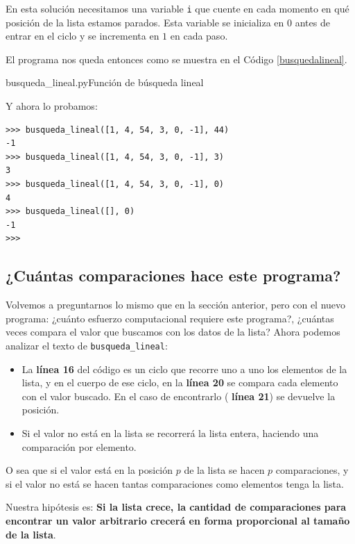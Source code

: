 En esta solución necesitamos una variable \lstinline!i! que cuente en cada
momento en qué posición de la lista estamos parados. Esta variable se
inicializa en $0$ antes de entrar en el ciclo y se incrementa en $1$ en
cada paso.

El programa nos queda entonces como se muestra en el Código
\ref{busquedalineal}. \\

\begin{codigo}{busqueda\_lineal.py}{Función de búsqueda lineal}
\label{busquedalineal}

\end{codigo}

Y ahora lo probamos:
\begin{verbatim}
>>> busqueda_lineal([1, 4, 54, 3, 0, -1], 44)
-1
>>> busqueda_lineal([1, 4, 54, 3, 0, -1], 3)
3
>>> busqueda_lineal([1, 4, 54, 3, 0, -1], 0)
4
>>> busqueda_lineal([], 0)
-1
>>>
\end{verbatim}

\subsection*{¿Cuántas comparaciones hace este programa?}

Volvemos a preguntarnos lo mismo que en la sección anterior, pero con el nuevo
programa: ¿cuánto esfuerzo computacional requiere este programa?, ¿cuántas
veces compara el valor que buscamos con los datos de la lista? Ahora podemos
analizar el texto de \lstinline!busqueda_lineal!:

\begin{itemize}
\item La {\bf línea 16} del código es un ciclo que recorre uno a uno los
elementos de la lista, y en el cuerpo de ese ciclo, en la {\bf línea 20} se
compara cada elemento con el valor buscado. En el caso de encontrarlo ({\bf
línea 21}) se devuelve la posición.

\item Si el valor no está en la lista se recorrerá la lista entera, haciendo
una comparación por elemento.
\end{itemize}

O sea que si el valor está en la posición $p$ de la lista se hacen $p$
comparaciones, y si el valor no está se hacen tantas comparaciones como
elementos tenga la lista.

Nuestra hipótesis es: {\bf Si la lista crece, la cantidad de comparaciones
para encontrar un valor arbitrario crecerá en forma proporcional al tamaño de
la lista}.


